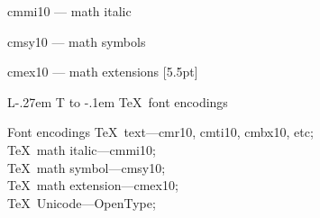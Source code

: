 \documentclass{beamer}
\makeatletter
\DeclareRobustCommand\LaTeX{L\kern-.27em%
  {\sbox\z@ T%
   \vbox to\ht\z@{\hbox{\check@mathfonts
                        \fontsize\sf@size\z@
                        \math@fontsfalse\selectfont
                        A}%
                  \vss}%
  }%
  \kern-.1em%
  \TeX}
\makeatother
\begin{document}
\begin{frame}{cmmi10 --- math italic}
\end{frame}

\begin{frame}{cmsy10 --- math symbols}
\end{frame}

\begin{frame}{cmex10 --- math extensions}
[5.5pt]
\end{frame}

\begin{frame}{\LaTeX\ font encodings}
\begin{exampleblock}{Font encodings}
\TeX\ text\hfill ---cmr10, cmti10, cmbx10, etc;\\
\TeX\ math italic\hfill ---cmmi10;\\
\TeX\ math symbol\hfill ---cmsy10;\\
\TeX\ math extension\hfill ---cmex10;\\
\TeX\ Unicode\hfill ---OpenType;
\end{exampleblock}
\end{frame}
\end{document}
